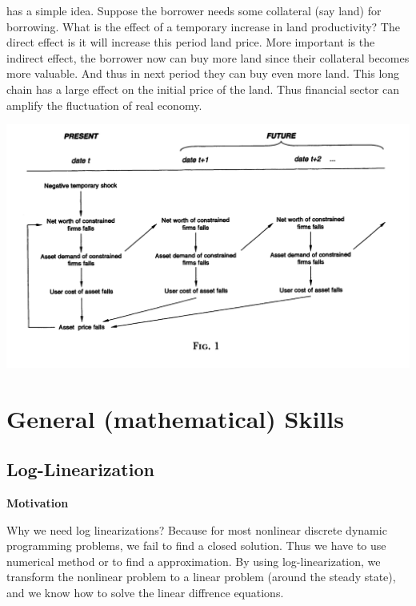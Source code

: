 \documentclass{book}
\theoremstyle{plain}
\theoremstyle{definition}
\begin{document}
\cite{Kiyotaki:1997hl} has a simple idea. Suppose the borrower needs some collateral (say land) for borrowing. What is the effect of a temporary increase in land productivity? The direct effect is it will increase this period land price. More important is the indirect effect, the borrower now can buy more land since their collateral becomes more valuable. And thus in next period they can buy even more land. This long chain has a large effect on the initial price of the land. Thus financial sector can amplify the fluctuation of real economy.

\includegraphics[width=\textwidth]{kiyotaki-moore-97.png}







\chapter{General (mathematical) Skills} %
\label{cha:general_mathematical_skills}

\section{Log-Linearization}

\noindent
\textbf{Motivation}

Why we need log linearizations?
Because for most nonlinear discrete dynamic programming problems,
we fail to find a closed solution.
Thus we have to use numerical method or to find a approximation.
By using log-linearization,
we transform the nonlinear problem to a linear problem (around the steady state),
and we know how to solve the linear diffrence equations.
\end{document}
